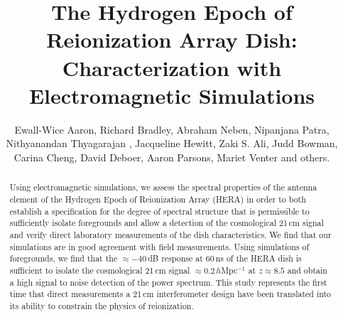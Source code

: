 \documentclass[twocolumn]{emulateapj}
\begin{document}
\title{The Hydrogen Epoch of Reionization Array Dish: Characterization with Electromagnetic Simulations}
\author{
Ewall-Wice Aaron,
Richard Bradley,
Abraham Neben,
Nipanjana Patra,
Nithyanandan Thyagarajan ,
Jacqueline Hewitt,
Zaki S. Ali,
Judd Bowman,
Carina Cheng,
David Deboer,
Aaron Parsons,
Mariet Venter
and others.
}

\begin{abstract}
Using electromagnetic simulations, we assess the spectral properties of the antenna element of the Hydrogen Epoch of Reionization Array (HERA) in order to both establish a specification for the degree of spectral structure that is permissible to sufficiently isolate foregrounds and allow a detection of the cosmological 21\,cm signal and verify direct laboratory measurements of the dish characteristics. We find that our simulations are in good agreement with field measurements. Using simulations of foregrounds, we find that the $\approx -40$\,dB response at 60\,ns of the HERA dish is sufficient to isolate the cosmological 21\,cm signal $\approx 0.2$\,$h$Mpc$^{-1}$ at $z\approx 8.5$ and obtain a high signal to noise detection of the power spectrum. This study represents the first time that direct measurements a 21\,cm interferometer design have been translated into its ability to constrain the physics of reionization. 
\end{abstract}
\end{document}
